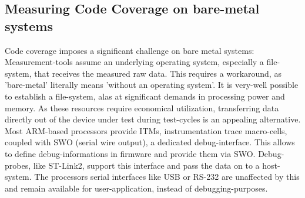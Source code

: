 			\subsection{Measuring Code Coverage on bare-metal systems}
			Code coverage imposes a significant challenge on bare metal systems: Measurement-tools assume an underlying operating system, especially a file-system, that receives the measured raw data. This requires a workaround, as 'bare-metal' literally means 'without an operating system'. It is very-well possible to establish a file-system, alas at significant demands in processing power and memory. As these resources require economical utilization, transferring data directly out of the device under test during test-cycles is an appealing alternative. Most ARM-based processors provide ITMs, instrumentation trace macro-cells, coupled with SWO (serial wire output), a dedicated debug-interface. This allows to define debug-informations in firmware and provide them via SWO. Debug-probes, like ST-Link2, support this interface and pass the data on to a host-system. The processors serial interfaces like USB or RS-232 are unaffected by this and remain available for user-application, instead of debugging-purposes. \\
			
